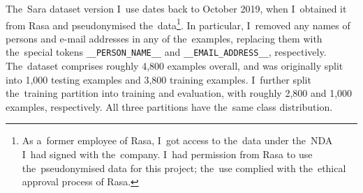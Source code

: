 \documentclass[bsc,frontabs,singlespacing,parskip,deptreport]{infthesis}
\begin{document}
{{{      The~Sara dataset version I~use dates back to October 2019, when I~obtained it from Rasa and pseudonymised the~data\footnote{As a~former employee of Rasa, I~got access to the~data under the~NDA I~had signed with the~company. I~had permission from Rasa to use the~pseudonymised data for this project; the~use complied with the~ethical approval process of Rasa.}. In particular, I~removed any names of persons and e-mail addresses in any of the~examples, replacing them with the~special tokens \verb|__PERSON_NAME__| and \verb|__EMAIL_ADDRESS__|, respectively.      
      The~dataset comprises roughly 4,800 examples overall, and was originally split into 1,000 testing examples and 3,800 training examples. 
      I~further split the~training partition into training and evaluation, with roughly 2,800 and 1,000 examples, respectively. All three partitions have the~same class distribution.

}}}
\end{document}
